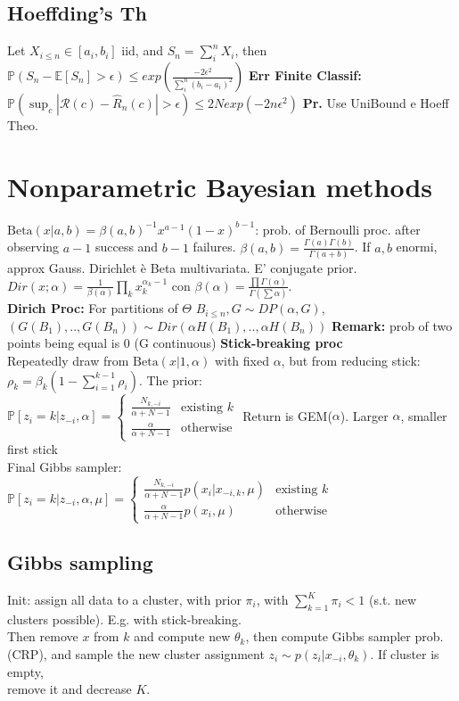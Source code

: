 \subsection*{Hoeffding's Th}
Let $X_{i\le n}\in[a_i,b_i]$ iid, and $S_n=\sum_i^nX_i$, then $\mathbb{P}(S_n-\mathbb{E}[S_n]>\epsilon)\le exp(\frac{-2\epsilon^2}{\sum_i^n(b_i-a_i)^2})$
\textbf{Err Finite Classif:} $\mathbb{P}(\sup_c|\mathcal R(c)-\hat R_n(c)|>\epsilon)\le 2Nexp(-2n\epsilon^2)$ \textbf{Pr.} Use UniBound e Hoeff Theo.

\section*{Nonparametric Bayesian methods}
$\text{Beta}(x|a,b)=\beta(a,b)^{-1} x^{a-1}(1-x)^{b-1}$: prob. of Bernoulli proc. after observing $a-1$ success and $b-1$ failures. $\beta(a,b)=\frac{\Gamma(a)\Gamma(b)}{\Gamma(a+b)}$. If $a,b$ enormi, approx Gauss.
Dirichlet è Beta multivariata. E' conjugate prior. $Dir(x;\alpha)=\frac{1}{\beta(\alpha)}\prod_k x_k^{\alpha_k-1}$ con $\beta(\alpha)=\frac{\prod\Gamma(\alpha)}{\Gamma(\sum\alpha)}$.\\
\textbf{Dirich Proc:} For partitions of $\Theta$ $B_{i\le n}, G\sim DP(\alpha,G)$, $(G(B_1),..,G(B_n))\sim Dir(\alpha H(B_1),..,\alpha H(B_n))$ \textbf{Remark:} prob of two points being equal is 0 (G continuous)
\textbf{Stick-breaking proc} \\ Repeatedly draw from $\text{Beta}(x|1,\alpha)$ with fixed $\alpha$, but from reducing stick: $\rho_k=\beta_k(1-\sum_{i=1}^{k-1}\rho_i)$. The prior:\\
$\mathbb{P}[z_i=k|z_{-i},\alpha]=\begin{cases}\frac{N_{k,-i}}{\alpha+N-1} & \text{existing }k \\ \frac{\alpha}{\alpha+N-1} & \text{otherwise}\end{cases}$ Return is GEM($\alpha$). Larger $\alpha$, smaller first stick\\
Final Gibbs sampler:\\
$\mathbb{P}[z_i=k|z_{-i},\alpha,\mu]=\begin{cases}\frac{N_{k,-i}}{\alpha+N-1}p(x_i|x_{-i,k},\mu) & \text{existing }k \\ \frac{\alpha}{\alpha+N-1}p(x_i,\mu) & \text{otherwise}\end{cases}$

\subsection*{Gibbs sampling}
Init: assign all data to a cluster, with prior $\pi_i$, with $\sum_{k=1}^K\pi_i<1$ (s.t. new clusters possible). E.g. with stick-breaking. \\
Then remove $x$ from $k$ and compute new $\theta_k$, then compute Gibbs sampler prob. (CRP), and sample the new cluster assignment $z_i\sim p(z_i|x_{-i},\theta_k)$. If cluster is empty, \\
remove it and decrease $K$.